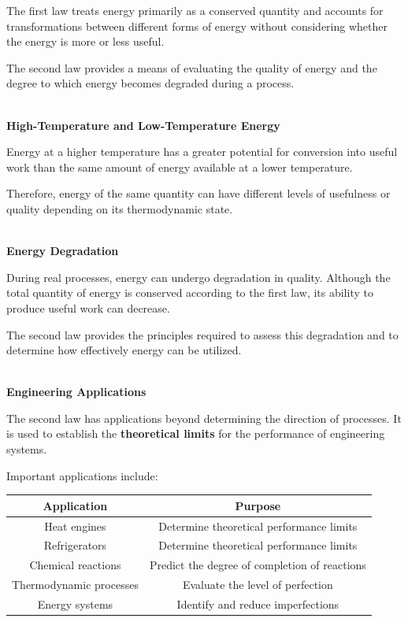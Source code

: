 \documentclass[12pt]{article}
\begin{document}
The first law treats energy primarily as a conserved quantity and accounts for transformations between different forms of energy without considering whether the energy is more or less useful.

The second law provides a means of evaluating the quality of energy and the degree to which energy becomes degraded during a process.

\textbf{\\ High-Temperature and Low-Temperature Energy}

Energy at a higher temperature has a greater potential for conversion into useful work than the same amount of energy available at a lower temperature.

Therefore, energy of the same quantity can have different levels of usefulness or quality depending on its thermodynamic state.

\textbf{\\ Energy Degradation}

During real processes, energy can undergo degradation in quality. Although the total quantity of energy is conserved according to the first law, its ability to produce useful work can decrease.

The second law provides the principles required to assess this degradation and to determine how effectively energy can be utilized.

\textbf{\\ Engineering Applications}

The second law has applications beyond determining the direction of processes. It is used to establish the \textbf{theoretical limits} for the performance of engineering systems.

Important applications include:

\begin{center}
\begin{tabular}{|c|c|}
\hline
\textbf{Application} & \textbf{Purpose} \\
\hline
Heat engines & Determine theoretical performance limits \\
\hline
Refrigerators & Determine theoretical performance limits \\
\hline
Chemical reactions & Predict the degree of completion of reactions \\
\hline
Thermodynamic processes & Evaluate the level of perfection \\
\hline
Energy systems & Identify and reduce imperfections \\
\hline
\end{tabular}
\end{center}
\end{document}
